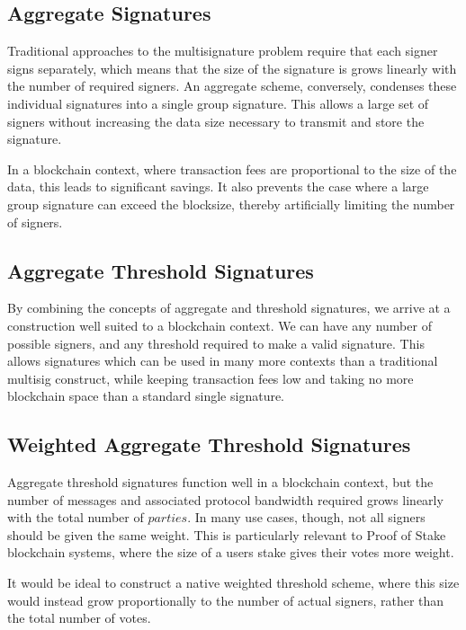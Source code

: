 \documentclass{article}
\begin{document}
\subsection{
  Aggregate Signatures
}

Traditional approaches to the multisignature problem require that each signer signs separately, which means that the size of the signature is grows linearly with the number of required signers.  An aggregate scheme, conversely, condenses these individual signatures into a single group signature.  This allows a large set of signers without increasing the data size necessary to transmit and store the signature.

In a blockchain context, where transaction fees are proportional to the size of the data, this leads to significant savings.  It also prevents the case where a large group signature can exceed the blocksize, thereby artificially limiting the number of signers.

\subsection{
  Aggregate Threshold Signatures
}

By combining the concepts of aggregate and threshold signatures, we arrive at a construction well suited to a blockchain context.  We can have any number of possible signers, and any threshold required to make a valid signature.  This allows signatures which can be used in many more contexts than a traditional multisig construct, while keeping transaction fees low and taking no more blockchain space than a standard single signature.

\subsection{
  Weighted Aggregate Threshold Signatures
}

Aggregate threshold signatures function well in a blockchain context, but the number of messages and associated protocol bandwidth required grows linearly with the total number of $parties$.  In many use cases, though, not all signers should be given the same weight.  This is particularly relevant to Proof of Stake blockchain systems, where the size of a users stake gives their votes more weight.

It would be ideal to construct a native weighted threshold scheme, where this size would instead grow proportionally to the number of actual signers, rather than the total number of votes.  
\end{document}
